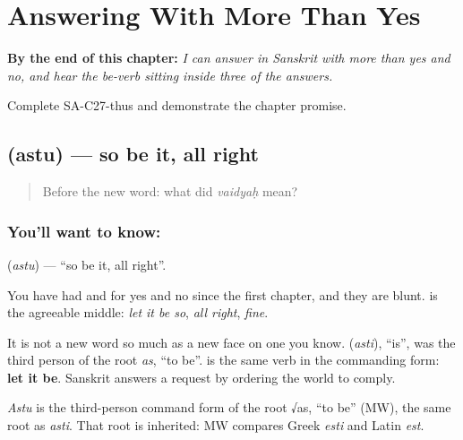 
\chapter{Answering With More Than Yes}
\label{ch:sa-replies}

\begin{chapteropening}
\textbf{By the end of this chapter:} \emph{I can answer in Sanskrit with more than yes and no, and hear the be-verb sitting inside three of the answers.}

Complete SA-C27-thus and demonstrate the chapter promise.
\end{chapteropening}

\section[\texorpdfstring{\sk{अस्तु} (astu)}{अस्तु (astu)}]{ (astu) — so be it, all right}

\label{lesson:SA-C27-so-be-it}



\begin{quote}
Before the new word: what did \emph{vaidyaḥ} mean?
\end{quote}

\subsection*{You'll want to know: }
\textbf{} (\emph{astu}) — \textquotedblleft{}so be it, all right\textquotedblright{}.

You have had \textbf{} and \textbf{} for yes and no since the first chapter, and they are blunt. \textbf{} is the agreeable middle: \emph{let it be so}, \emph{all right}, \emph{fine}.

It is not a new word so much as a new face on one you know. \textbf{} (\emph{asti}), \textquotedblleft{}is\textquotedblright{}, was the third person of the root \emph{as}, \textquotedblleft{}to be\textquotedblright{}.  is the same verb in the commanding form: \textbf{let it be}. Sanskrit answers a request by ordering the world to comply.

\begin{cousinweb}
\emph{Astu} is the third-person command form of the root √as, \textquotedblleft{}to be\textquotedblright{} (MW), the same root as \emph{asti}. That root is inherited: MW compares Greek \emph{esti} and Latin \emph{est}.
\end{cousinweb}

